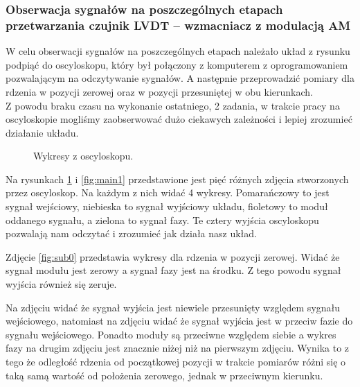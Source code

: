\documentclass{article}
\begin{document}
\newpage
\subsubsection{Obserwacja sygnałów na poszczególnych etapach przetwarzania czujnik LVDT – wzmacniacz z modulacją AM}

W celu obserwacji sygnałów na poszczególnych etapach należało układ z rysunku  podpiąć do oscyloskopu, który był połączony z komputerem z oprogramowaniem pozwalającym na odczytywanie sygnałów. 
A następnie przeprowadzić pomiary dla rdzenia w pozycji zerowej oraz w pozycji przesuniętej w obu kierunkach.\\
Z powodu braku czasu na wykonanie ostatniego, 2 zadania, w trakcie pracy na oscyloskopie mogliśmy zaobserwować dużo ciekawych zależności i lepiej zrozumieć działanie układu.

\begin{figure}[!ht]
    \centering
    \hfill
    
    \caption{Wykresy z oscyloskopu.}
    \label{fig:main}
\end{figure}

\newpage
Na rysunkach \ref{fig:main} i \ref{fig:main1} przedstawione jest pięć różnych zdjęcia stworzonych przez oscyloskop. Na każdym z nich widać 4 wykresy. Pomarańczowy to jest sygnał wejściowy, niebieska to sygnał wyjściowy układu, fioletowy to moduł oddanego sygnału, a zielona to sygnał fazy. Te cztery wyjścia oscyloskopu pozwalają nam odczytać i zrozumieć jak działa nasz układ.

\vspace{1em}
Zdjęcie \ref{fig:sub0} przedstawia wykresy dla rdzenia w pozycji zerowej. Widać że sygnał modułu jest zerowy a sygnał fazy jest na środku. Z tego powodu sygnał wyjścia również się zeruje.

\vspace{1em}
Na zdjęciu  widać że sygnał wyjścia jest niewiele przesunięty względem sygnału wejściowego, natomiast na zdjęciu  widać że sygnał wyjścia jest w przeciw fazie do sygnału wejściowego. Ponadto moduły są przeciwne względem siebie a wykres fazy na drugim zdjęciu jest znacznie niżej niż na pierwszym zdjęciu. 
Wynika to z tego że odległość rdzenia od początkowej pozycji w trakcie pomiarów różni się o taką samą wartość od położenia zerowego, jednak w przeciwnym kierunku.
\end{document}
